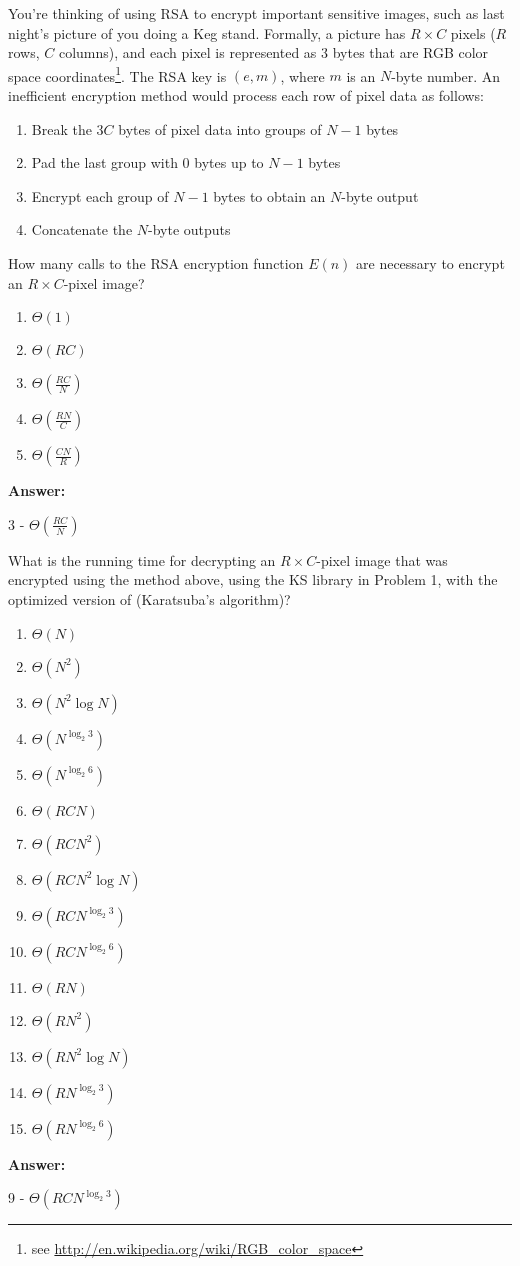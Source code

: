 \documentclass[12pt,twoside]{article}
\newcommand{\answer}{
 \par\medskip
 \textbf{Answer:}
}
\newcommand{\answerIIb}{ \answer
3 - $\Theta(\frac{RC}{N})$
}
\newcommand{\answerIIc}{ \answer
9 - $\Theta(RCN^{\log_2 3})$
}
\begin{document}
\begin{problems}
\begin{problemparts}
\end{problemparts}

You're thinking of using RSA to encrypt important sensitive images, such as
last night's picture of you doing a Keg stand. Formally, a picture has $R \times
C$ pixels ($R$ rows, $C$ columns), and each pixel is represented as 3 bytes that
are RGB color space coordinates\footnote{see
\url{http://en.wikipedia.org/wiki/RGB_color_space}}. The RSA key is $(e, m)$,
where $m$ is an $N$-byte number. An inefficient encryption method would process
each row of pixel data as follows:
\begin{enumerate}
  \item Break the $3C$ bytes of pixel data into groups of $N-1$ bytes
  \item Pad the last group with 0 bytes up to $N-1$ bytes
  \item Encrypt each group of $N-1$ bytes to obtain an $N$-byte output
  \item Concatenate the $N$-byte outputs 
\end{enumerate}

\begin {problemparts}
\problempart {} How many calls to the RSA encryption function $E(n)$
are necessary to encrypt an $R \times C$-pixel image?
\begin{enumerate}
  \item $\Theta(1)$
  \item $\Theta(R C)$
  \item $\Theta(\frac{RC}{N})$
  \item $\Theta(\frac{RN}{C})$
  \item $\Theta(\frac{CN}{R})$
\end{enumerate}
\answerIIb

\problempart {} What is the running time for decrypting an $R \times
C$-pixel image that was encrypted using the method above, using the KS library
in Problem 1, with the optimized version of  (Karatsuba's
algorithm)?
\begin{enumerate}
  \item $\Theta(N)$
  \item $\Theta(N^2)$
  \item $\Theta(N^2 \log N)$
  \item $\Theta(N^{\log_2 3})$
  \item $\Theta(N^{\log_2 6})$
  \item $\Theta(R C N)$
  \item $\Theta(R C N^2)$
  \item $\Theta(R C N^2 \log N)$
  \item $\Theta(R C N^{\log_2 3})$
  \item $\Theta(R C N^{\log_2 6})$
  \item $\Theta(R N)$
  \item $\Theta(R N^2)$
  \item $\Theta(R N^2 \log N)$
  \item $\Theta(R N^{\log_2 3})$
  \item $\Theta(R N^{\log_2 6})$
\end{enumerate}
\answerIIc


\end{problemparts}
\end{problems}
\end{document}
